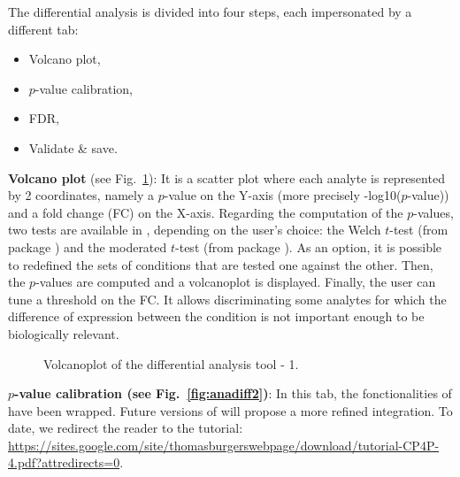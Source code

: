 \documentclass[12pt]{article}
\begin{document}
{The differential analysis is divided into four steps, each impersonated by a 
different tab:
\begin{itemize}
\item Volcano plot,
\item $p$-value calibration,
\item FDR,
\item Validate \& save.
\end{itemize}}


\textbf {Volcano plot} (see Fig.~\ref{fig:anadiff1}): It is a scatter plot 
where each analyte is represented by 2 coordinates, namely a $p$-value on the 
Y-axis (more precisely -log10($p$-value)) and a fold change (FC) on the 
X-axis. Regarding the computation of the $p$-values, two tests are available 
in , depending on the user's choice: the Welch $t$-test 
(from package ) and the moderated $t$-test (from package 
).
As an option, it is possible to redefined the sets of conditions that are 
tested one against the other. 
Then, the $p$-values are computed and a volcanoplot is displayed. 
Finally, the user can tune a threshold on the FC. It allows discriminating 
some analytes for which the difference of expression between the condition is 
not important enough to be biologically relevant.

\begin {figure}
\centering
{}
\caption{Volcanoplot of the differential analysis tool - 1.}
\label{fig:anadiff1}
\end {figure}


\textbf{$p$-value calibration (see Fig.~\ref{fig:anadiff2})}: In this tab, 
the fonctionalities of  have been wrapped. Future versions of 
 will propose a more refined integration. To date, we 
redirect the reader to the  tutorial: 
\url{https://sites.google.com/site/thomasburgerswebpage/download/tutorial-CP4P-
4.pdf?attredirects=0}. 
\end{document}
